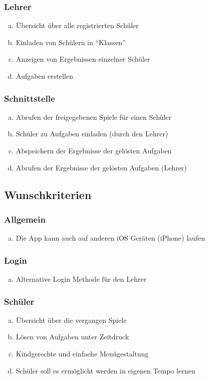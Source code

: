 \subsubsection{Lehrer}
\begin{enumerate}[a)]
\item Übersicht über alle registrierten Schüler
\item Einladen von Schülern in “Klassen”
\item Anzeigen von Ergebnissen einzelner Schüler
\item Aufgaben erstellen
\end{enumerate}


\subsubsection{Schnittstelle}
\begin{enumerate}[a)]
\item Abrufen der freigegebenen Spiele für einen Schüler
\item Schüler zu Aufgaben einladen (durch den Lehrer)
\item Abspeichern der Ergebnisse der gelösten Aufgaben
\item Abrufen der Ergebnisse der gelösten Aufgaben (Lehrer)
\end{enumerate}


\subsection{Wunschkriterien}
\subsubsection{Allgemein}
\begin{enumerate}[a)]
\item Die App kann auch auf anderen iOS Geräten (iPhone) laufen
\end{enumerate}

\subsubsection{Login}
\begin{enumerate}[a)]
\item Alternative Login Methode für den Lehrer
\end{enumerate}

\subsubsection{Schüler}
\begin{enumerate}[a)]
\item Übersicht über die vergangen Spiele
\item Lösen von Aufgaben unter Zeitdruck
\item Kindgerechte und einfache Menügestaltung
\item Schüler soll es ermöglicht werden in eigenen Tempo lernen
\end{enumerate}

